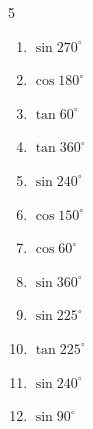 \begin{multicols}{5}
\begin{enumerate}
        \phantom{$\displaystyle =1$}

  \item $\displaystyle \sin{270^\circ}$

        \phantom{$\displaystyle =-1$}

  \item $\displaystyle \cos{180^\circ}$

        \phantom{$\displaystyle =-1$}

\columnbreak %

\resetques

  \item $\displaystyle \tan{60^\circ}$


  \item $\displaystyle \tan{360^\circ}$

        \phantom{$\displaystyle =0$}

  \item $\displaystyle \sin{240^\circ}$


  \item $\displaystyle \cos{150^\circ}$


  \item $\displaystyle \cos{60^\circ}$


  \item $\displaystyle \sin{360^\circ}$

        \phantom{$\displaystyle =0$}

  \item $\displaystyle \sin{225^\circ}$


  \item $\displaystyle \tan{225^\circ}$

        \phantom{$\displaystyle =1$}

  \item $\displaystyle \sin{240^\circ}$


  \item $\displaystyle \sin{90^\circ}$

        \phantom{$\displaystyle =1$}


\end{enumerate}
\end{multicols}
